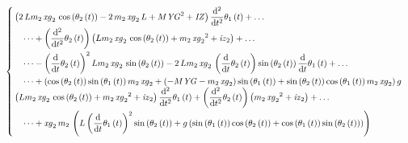 \begin{equation}
    \label{eq:dummy}
\begin{cases}
\begin{split}
&\left( 2\,Lm_{2}\,{\it xg}_{2}\,\cos\left( \theta_{2} \left( t \right)  \right) -2\,m_{2}\,{\it xg}_{2}\,L+M{{\it YG}}^{2}+{\it IZ} \right) {\frac {{\rm d}^{2}}{{\rm d}{t}^{2}}}\theta_{1} \left( t \right) + \dots \\
& \quad \dots +\left( {\frac {{\rm d}^{2}}{{\rm d}{t}^{2}}}\theta_{2} \left( t \right)  \right)  \left( Lm_{2}\,{\it xg}_{2}\,\cos \left( \theta_{2} \left( t \right)  \right) +m_{2}\,{{\it xg}_{2}}^{2}+{\it iz}_{2} \right) + \dots\\
&\quad \dots - \left( {\frac {\rm d}{{\rm d}t}}\theta_{2} \left( t \right)  \right) ^{2}Lm_{2}\,{\it xg}_{2}\,\sin \left( \theta_{2} \left( t \right)  \right) -2\,Lm_{2}\,{\it xg}_{2}\,\left( {\frac {\rm d}{{\rm d}t}}\theta_{2} \left( t \right)  \right) \sin \left( \theta_{2} \left( t \right)  \right) {\frac {\rm d}{{\rm d}t}}\theta_{1} \left( t \right) + \dots\\
&\quad \dots + \left( \cos \left( \theta_{2}\left( t \right)  \right) \sin \left( \theta_{1} \left( t \right) \right) m_{2}\,{\it xg}_{2}+\left( -M{\it YG}-m_{2}\,{\it xg}_{2}\right) \sin \left( \theta_{1} \left( t \right)  \right) + \sin\left( \theta_{2} \left( t \right)  \right) \cos \left( \theta_{1}\left( t \right)  \right) m_{2}\,{\it xg}_{2} \right) g
\end{split}\\
\begin{split}
&\left( Lm_{2}\,{\it xg}_{2}\,\cos \left( \theta_{2} \left( t \right)  \right) +m_{2}\,{{\it xg}_{2}}^{2}+{\it iz}_{2} \right) {\frac {{\rm d}^{2}}{{\rm d}{t}^{2}}}\theta_{1} \left( t \right) + \left( {\frac {{\rm d}^{2}}{{\rm d}{t}^{2}}}\theta_{2} \left( t \right)  \right)  \left( m_{2}\,{{\it xg}_{2}}^{2}+{\it iz}_{2} \right) +  \dots\\
&\quad \dots + {\it xg}_{2}\,m_{2}\, \left( L\left( {\frac {\rm d}{{\rm d}t}}\theta_{1} \left( t \right)  \right) ^{2}\sin \left( \theta_{2} \left( t \right)  \right) +g \left( \sin\left( \theta_{1} \left( t \right)  \right) \cos \left( \theta_{2}\left( t \right)  \right) +\cos \left( \theta_{1} \left( t \right) \right) \sin \left( \theta_{2} \left( t \right)  \right)  \right) \right) 
\end{split}
\end{cases}    
\end{equation}
\normalsize
%
